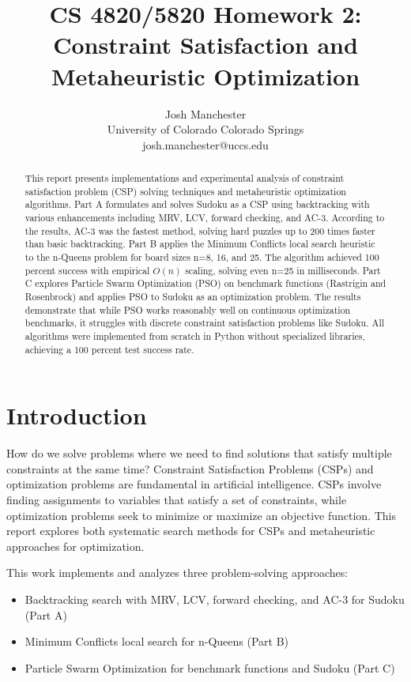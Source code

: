 \documentclass[letterpaper]{article}
\title{CS 4820/5820 Homework 2:\\
Constraint Satisfaction and Metaheuristic Optimization}
\author{
Josh Manchester\\
University of Colorado Colorado Springs\\
josh.manchester@uccs.edu
}
\begin{document}
\maketitle

\begin{abstract}
This report presents implementations and experimental analysis of constraint satisfaction problem (CSP) solving techniques and metaheuristic optimization algorithms. Part A formulates and solves Sudoku as a CSP using backtracking with various enhancements including MRV, LCV, forward checking, and AC-3. According to the results, AC-3 was the fastest method, solving hard puzzles up to 200 times faster than basic backtracking. Part B applies the Minimum Conflicts local search heuristic to the n-Queens problem for board sizes n=8, 16, and 25. The algorithm achieved 100 percent success with empirical $O(n)$ scaling, solving even n=25 in milliseconds. Part C explores Particle Swarm Optimization (PSO) on benchmark functions (Rastrigin and Rosenbrock) and applies PSO to Sudoku as an optimization problem. The results demonstrate that while PSO works reasonably well on continuous optimization benchmarks, it struggles with discrete constraint satisfaction problems like Sudoku. All algorithms were implemented from scratch in Python without specialized libraries, achieving a 100 percent test success rate.
\end{abstract}

\section{Introduction}

How do we solve problems where we need to find solutions that satisfy multiple constraints at the same time? Constraint Satisfaction Problems (CSPs) and optimization problems are fundamental in artificial intelligence. CSPs involve finding assignments to variables that satisfy a set of constraints, while optimization problems seek to minimize or maximize an objective function. This report explores both systematic search methods for CSPs and metaheuristic approaches for optimization.

This work implements and analyzes three problem-solving approaches:
\begin{itemize}
\item Backtracking search with MRV, LCV, forward checking, and AC-3 for Sudoku (Part A)
\item Minimum Conflicts local search for n-Queens (Part B)
\item Particle Swarm Optimization for benchmark functions and Sudoku (Part C)
\end{itemize}
\end{document}
